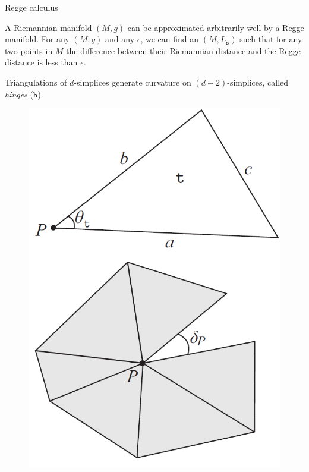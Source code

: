 \documentclass[12pt,titlepage]{article}
\begin{document}
\begin{frame}{Regge calculus}
    \begin{list}{\,}{\leftmargin=1em \itemindent=0em}
        \item A Riemannian manifold $(M,g)$ can be approximated arbitrarily well by a Regge manifold. For any $(M,g)$ and any $\epsilon$, we can find an $(M,L_\mathtt{s})$ such that for any two points in $M$ the difference between their Riemannian distance and the Regge distance is less than $\epsilon$.
        \item Triangulations of $d$-simplices generate curvature on $(d-2)$-simplices, called \textit{hinges} ($\mathtt{h}$).
        \item \noindent\FloatBarrier
        \begin{figure}[!ht]
            \begin{minipage}{0.3\linewidth}
                \includegraphics[width=\linewidth]{4.3.png}

\end{minipage}
\end{figure}
\end{list}
\end{frame}
\end{document}
